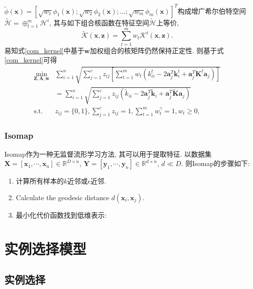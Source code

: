 \documentclass[lang=cn,10pt]{gorgeousnbook}
\numberwithin{equation}{section}%
\numberwithin{figure}{section}%
\begin{document}
$\tilde{\phi}(\boldsymbol{x})=[\sqrt{w_1}\phi_1(\boldsymbol{x});\sqrt{w_2}\phi_2(\boldsymbol{x});\ldots;\sqrt{w_m}\phi_m(\boldsymbol{x})]^T$构成增广希尔伯特空间$\tilde{\mathcal{H}}=\oplus_{t=1}^m\mathcal{H}^i$, 其与如下组合核函数在特征空间$\tilde{\mathcal{H}}$上等价, 
\begin{equation}
\tilde{\mathcal{K}}(\boldsymbol{x},\boldsymbol{z})=\sum_{t=1}^mw_t\mathcal{K}^t(\boldsymbol{x},\boldsymbol{z}). \label{com_kernel}
\end{equation}
易知式\eqref{com_kernel}中基于$\bm{w}$加权组合的核矩阵仍然保持正定性. 则基于式\eqref{com_kernel}可得
\begin{equation}
\begin{aligned}
\min_{\bm{Z},\bm{A},\boldsymbol{w}}& \sum_{i=1}^n\sqrt{\sum_{j=1}^cz_{ij}[\sum_{t=1}^mw_t(k_{ii}^t-2\boldsymbol{a}_j^T\boldsymbol{k}_i^t+\boldsymbol{a}_j^T\bm{K}^t\boldsymbol{a}_j)]}  \\
&=\sum_{i=1}^n\sqrt{\sum_{j=1}^cz_{ij}(\tilde{k}_{ii}-2\boldsymbol{a}_j^T\tilde{\boldsymbol{k}}_i+\boldsymbol{a}_j^T\bm{\tilde{K}}\boldsymbol{a}_j)}\quad \\
\text{s.t.}& z_{ij}=\{0,1\},\sum_{j=1}^{c}z_{ij}=1,\sum_{t=1}^{m}w_{t}^{\gamma}=1,w_{t}\geq0, 
\end{aligned}
\end{equation}
\section{Isomap}
Isomap作为一种无监督流形学习方法, 其可以用于提取特征. 以数据集$\bm{X}=\left[ \mathbf{x}_1,\cdots,\mathbf{x}_n \right] \in \mathbb{R}^{D\times n}$, $\bm{Y}=\left[ \mathbf{y}_1,\cdots,\mathbf{y}_n \right] \in \mathbb{R}^{d\times n}$, $d\ll D$. 则Isomap的步骤如下:
\begin{enumerate}[1)]
\item 计算所有样本的$k$近邻或$\epsilon$近邻. 
 \item Calculate the geodesic distance $d(\bm{x}_i,\bm{x}_j)$.
 \item  最小化代价函数找到低维表示:
\end{enumerate}



\mainmatter
{}
\part{实例选择模型}

\chapter{实例选择}
\end{document}
